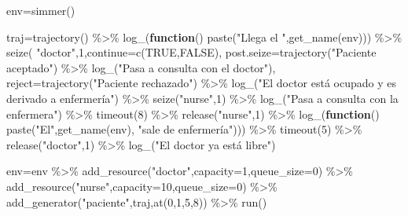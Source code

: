 \documentclass[
]{book}
\newenvironment{Shaded}{\begin{snugshade}}{\end{snugshade}}
\newcommand{\AttributeTok}[1]{\textcolor[rgb]{0.77,0.63,0.00}{#1}}
\newcommand{\ConstantTok}[1]{\textcolor[rgb]{0.00,0.00,0.00}{#1}}
\newcommand{\ControlFlowTok}[1]{\textcolor[rgb]{0.13,0.29,0.53}{\textbf{#1}}}
\newcommand{\DecValTok}[1]{\textcolor[rgb]{0.00,0.00,0.81}{#1}}
\newcommand{\FunctionTok}[1]{\textcolor[rgb]{0.00,0.00,0.00}{#1}}
\newcommand{\NormalTok}[1]{#1}
\newcommand{\OtherTok}[1]{\textcolor[rgb]{0.56,0.35,0.01}{#1}}
\newcommand{\SpecialCharTok}[1]{\textcolor[rgb]{0.00,0.00,0.00}{#1}}
\newcommand{\StringTok}[1]{\textcolor[rgb]{0.31,0.60,0.02}{#1}}
\theoremstyle{definition}
\theoremstyle{definition}
\theoremstyle{definition}
\theoremstyle{definition}
\theoremstyle{remark}
\begin{document}
\begin{Shaded}
\begin{Highlighting}[]
\NormalTok{env}\OtherTok{=}\FunctionTok{simmer}\NormalTok{()}

\NormalTok{traj}\OtherTok{=}\FunctionTok{trajectory}\NormalTok{() }\SpecialCharTok{\%\textgreater{}\%}
  \FunctionTok{log\_}\NormalTok{(}\ControlFlowTok{function}\NormalTok{() }\FunctionTok{paste}\NormalTok{(}\StringTok{"Llega el "}\NormalTok{,}\FunctionTok{get\_name}\NormalTok{(env))) }\SpecialCharTok{\%\textgreater{}\%}
  \FunctionTok{seize}\NormalTok{(}
    \StringTok{"doctor"}\NormalTok{,}\DecValTok{1}\NormalTok{,}\AttributeTok{continue=}\FunctionTok{c}\NormalTok{(}\ConstantTok{TRUE}\NormalTok{,}\ConstantTok{FALSE}\NormalTok{),}
    \AttributeTok{post.seize=}\FunctionTok{trajectory}\NormalTok{(}\StringTok{"Paciente aceptado"}\NormalTok{) }\SpecialCharTok{\%\textgreater{}\%} 
      \FunctionTok{log\_}\NormalTok{(}\StringTok{"Pasa a consulta con el doctor"}\NormalTok{), }
    \AttributeTok{reject=}\FunctionTok{trajectory}\NormalTok{(}\StringTok{"Paciente rechazado"}\NormalTok{) }\SpecialCharTok{\%\textgreater{}\%} 
      \FunctionTok{log\_}\NormalTok{(}\StringTok{"El doctor está ocupado y es derivado a enfermería"}\NormalTok{) }\SpecialCharTok{\%\textgreater{}\%} 
      \FunctionTok{seize}\NormalTok{(}\StringTok{"nurse"}\NormalTok{,}\DecValTok{1}\NormalTok{) }\SpecialCharTok{\%\textgreater{}\%}
      \FunctionTok{log\_}\NormalTok{(}\StringTok{"Pasa a consulta con la enfermera"}\NormalTok{) }\SpecialCharTok{\%\textgreater{}\%}
      \FunctionTok{timeout}\NormalTok{(}\DecValTok{8}\NormalTok{) }\SpecialCharTok{\%\textgreater{}\%}
      \FunctionTok{release}\NormalTok{(}\StringTok{"nurse"}\NormalTok{,}\DecValTok{1}\NormalTok{) }\SpecialCharTok{\%\textgreater{}\%}
      \FunctionTok{log\_}\NormalTok{(}\ControlFlowTok{function}\NormalTok{() }\FunctionTok{paste}\NormalTok{(}\StringTok{"El"}\NormalTok{,}\FunctionTok{get\_name}\NormalTok{(env), }\StringTok{"sale de enfermería"}\NormalTok{))) }\SpecialCharTok{\%\textgreater{}\%}
  \FunctionTok{timeout}\NormalTok{(}\DecValTok{5}\NormalTok{) }\SpecialCharTok{\%\textgreater{}\%} 
  \FunctionTok{release}\NormalTok{(}\StringTok{"doctor"}\NormalTok{,}\DecValTok{1}\NormalTok{) }\SpecialCharTok{\%\textgreater{}\%} 
  \FunctionTok{log\_}\NormalTok{(}\StringTok{"El doctor ya está libre"}\NormalTok{)}

\NormalTok{env}\OtherTok{=}\NormalTok{env }\SpecialCharTok{\%\textgreater{}\%}
   \FunctionTok{add\_resource}\NormalTok{(}\StringTok{"doctor"}\NormalTok{,}\AttributeTok{capacity=}\DecValTok{1}\NormalTok{,}\AttributeTok{queue\_size=}\DecValTok{0}\NormalTok{) }\SpecialCharTok{\%\textgreater{}\%} 
   \FunctionTok{add\_resource}\NormalTok{(}\StringTok{"nurse"}\NormalTok{,}\AttributeTok{capacity=}\DecValTok{10}\NormalTok{,}\AttributeTok{queue\_size=}\DecValTok{0}\NormalTok{) }\SpecialCharTok{\%\textgreater{}\%}
   \FunctionTok{add\_generator}\NormalTok{(}\StringTok{"paciente"}\NormalTok{,traj,}\FunctionTok{at}\NormalTok{(}\DecValTok{0}\NormalTok{,}\DecValTok{1}\NormalTok{,}\DecValTok{5}\NormalTok{,}\DecValTok{8}\NormalTok{)) }\SpecialCharTok{\%\textgreater{}\%}
   \FunctionTok{run}\NormalTok{()}
\end{Highlighting}
\end{Shaded}
\end{document}
